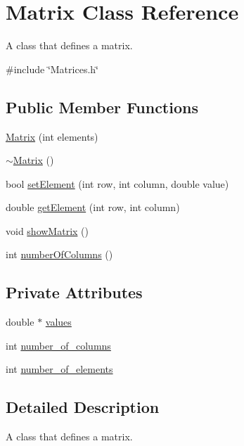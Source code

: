 \hypertarget{classMatrix}{\section{Matrix Class Reference}
\label{classMatrix}
}


A class that defines a matrix.  




{\ttfamily \#include \char`\"{}Matrices.\-h\char`\"{}}

\subsection*{Public Member Functions}
\begin{DoxyCompactItemize}
\item 
\hyperlink{classMatrix_a6c846d0a46676ff6addbcd04e2d516cc}{Matrix} (int elements)
\item 
\hyperlink{classMatrix_a9b1c3627f573d78a2f08623fdfef990f}{$\sim$\-Matrix} ()
\item 
bool \hyperlink{classMatrix_a98ba0c156a03a068759c4c2b8eb837eb}{set\-Element} (int row, int column, double value)
\item 
double \hyperlink{classMatrix_a37b3a00db12f5838c164960ecf2ce42e}{get\-Element} (int row, int column)
\item 
void \hyperlink{classMatrix_ad5fe18fa5ffe97bda044000d45bf1547}{show\-Matrix} ()
\item 
int \hyperlink{classMatrix_af4421f66ac5f486116ebfe10f2cced18}{number\-Of\-Columns} ()
\end{DoxyCompactItemize}
\subsection*{Private Attributes}
\begin{DoxyCompactItemize}
\item 
double $\ast$ \hyperlink{classMatrix_a19505b0b139553ad1ee2291f3d8385a9}{values}
\item 
int \hyperlink{classMatrix_afd4ab1ffa8fadfcaae4ebcf7802c0fef}{number\-\_\-of\-\_\-columns}
\item 
int \hyperlink{classMatrix_ad88772bca79eec502f3737b027431c60}{number\-\_\-of\-\_\-elements}
\end{DoxyCompactItemize}


\subsection{Detailed Description}
A class that defines a matrix. 

